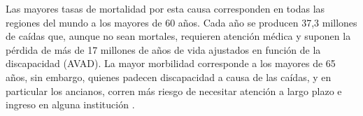 Las mayores tasas de mortalidad por esta causa corresponden en todas las regiones del mundo a los mayores de 60 años. Cada año se producen 37,3 millones de caídas que, aunque no sean mortales, requieren atención médica y suponen la pérdida de más de 17 millones de años de vida ajustados en función de la discapacidad (AVAD). La mayor morbilidad corresponde a los mayores de 65 años, sin embargo, quienes padecen discapacidad a causa de las caídas, y en particular los ancianos, corren más riesgo de necesitar atención a largo plazo e ingreso en alguna institución \cite{nueve}.
